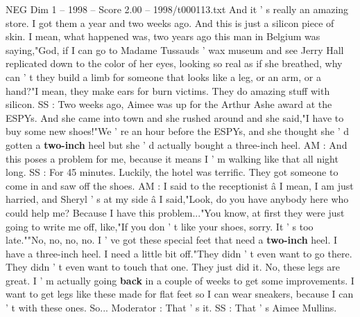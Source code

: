 \begin{textsample}{NEG Dim 1 – 1998 – Score 2.00 – 1998/t000113.txt}
And it ' s really an amazing store.
I got them a year and two weeks ago.
And this is just a silicon piece of skin.
I mean, what happened was, two years ago this man in Belgium was saying,"God, if I can go to Madame Tussauds ' wax museum and see Jerry Hall replicated down to the color of her eyes, looking so real as if she breathed, why can ' t they build a limb for someone that looks like a leg, or an arm, or a hand?"I mean, they make ears for burn victims.
They do amazing stuff with silicon.
SS : Two weeks ago, Aimee was up for the Arthur Ashe award at the ESPYs.
And she came into town and she rushed around and she said,"I have to buy some new shoes!"We ' re an hour before the ESPYs, and she thought she ' d gotten a \textbf{two-inch} heel but she ' d actually bought a three-inch heel.
AM : And this poses a problem for me, because it means I ' m walking like that all night long.
SS : For 45 minutes.
Luckily, the hotel was terrific.
They got someone to come in and saw off the shoes.
AM : I said to the receptionist â I mean, I am just harried, and Sheryl ' s at my side â I said,"Look, do you have anybody here who could help me?
Because I have this problem..."You know, at first they were just going to write me off, like,"If you don ' t like your shoes, sorry.
It ' s too late.""No, no, no, no.
I ' ve got these special feet that need a \textbf{two-inch} heel.
I have a three-inch heel.
I need a little bit off."They didn ' t even want to go there.
They didn ' t even want to touch that one.
They just did it.
No, these legs are great.
I ' m actually going \textbf{back} in a couple of weeks to get some improvements.
I want to get legs like these made for flat feet so I can wear sneakers, because I can ' t with these ones.
So...
Moderator : That ' s it.
SS : That ' s Aimee Mullins.

\end{textsample}
